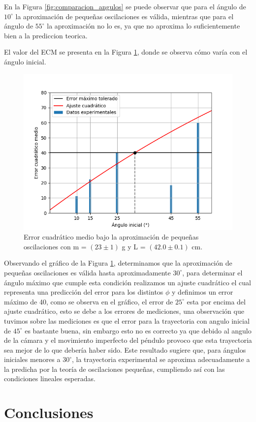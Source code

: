 \documentclass[12pt,a4]{article}
\begin{document}
En la Figura \ref{fig:comparacion_angulos} se puede observar que para el ángulo de $10^\circ$ la aproximación de pequeñas oscilaciones es válida, mientras que para el ángulo de $55^\circ$ la aproximación no lo es, ya que no aproxima lo suficientemente bien a la prediccion teorica.

El valor del ECM se presenta en la Figura \ref{fig:pequeñas_oscilaciones}, donde se observa cómo varía con el ángulo inicial.

\begin{figure}[H]
    \centering
    \includegraphics[width=0.6\linewidth]{peq_oscilaciones.png}
    \caption{Error cuadrático medio bajo la aproximación de pequeñas oscilaciones con m = $(23\pm1)$ g y L = $(42.0\pm0.1)$ cm.}
    \label{fig:pequeñas_oscilaciones}
\end{figure}
Observando el gráfico de la Figura \ref{fig:pequeñas_oscilaciones}, determinamos que la aproximación de pequeñas oscilaciones es válida hasta aproximadamente $30^\circ$, para determinar el ángulo máximo que cumple esta condición realizamos un ajuste cuadrático el cual representa una predicción del error para los distintos $\phi$ y definimos un error máximo de 40, como se observa en el gráfico, el error de $25^\circ$ esta por encima del ajuste cuadrático, esto se debe a los errores de mediciones, una observación que tuvimos sobre las mediciones es que el error para la trayectoria con angulo inicial de $45^\circ$ es bastante buena, sin embargo esto no es correcto ya que debido al angulo de la cámara y el movimiento imperfecto del péndulo provoco que esta trayectoria sea mejor de lo que debería haber sido. Este resultado sugiere que, para ángulos iniciales menores a $30^\circ$, la trayectoria experimental se aproxima adecuadamente a la predicha por la teoría de oscilaciones pequeñas, cumpliendo así con las condiciones lineales esperadas.

\section{Conclusiones}
\end{document}
